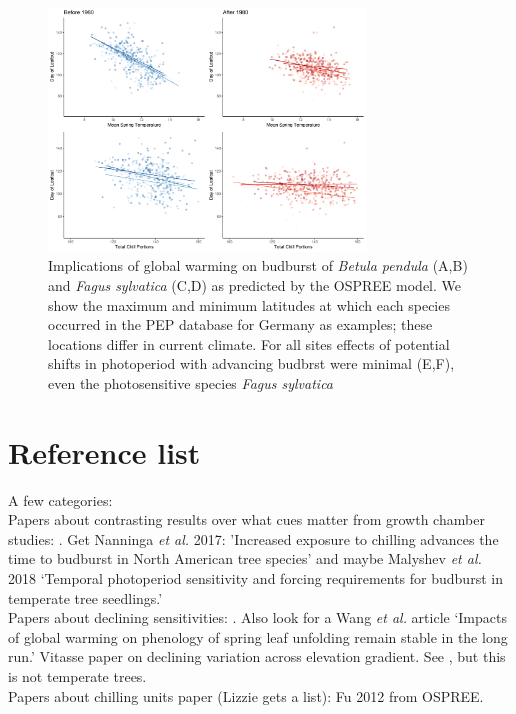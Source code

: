 \documentclass{article}
\begin{document}
\newpage
\begin{figure}[h!]
\centering
\noindent \includegraphics[width=0.75\textwidth]{..//..//analyses/bb_analysis/PEP_climate/figures/BETPEN_multruns_portions.pdf}
\caption{Implications of global warming on budburst of \emph{Betula pendula} (A,B) and \emph{Fagus sylvatica} (C,D) as predicted by the OSPREE model. We show the maximum and minimum latitudes at which each species occurred in the PEP database for Germany as examples; these locations differ in current climate. For all sites effects of potential shifts in photoperiod with advancing budbrst were minimal (E,F), even the photosensitive species \emph{Fagus sylvatica}}
\label{fig:pep}
\end{figure}


\section*{Reference list}

A few categories:\\

Papers about contrasting results over what cues matter from growth chamber studies: \cite{Basler:2012,Basler:2014aa,Caffarra:2011qf,Caffarra:2011a,Caffarra:2011b,Heide:2005aa,koerner2010b,Laube:2014a,vitasse2013,zohner2016}. Get Nanninga \emph{et al.} 2017: 'Increased exposure to chilling advances the time to budburst in North American tree species' and maybe Malyshev \emph{et al.} 2018 `Temporal photoperiod sensitivity and forcing requirements for budburst in temperate tree seedlings.'\\

Papers about declining sensitivities: \cite{Rutishauser:2008,fu2015}. Also look for a Wang \emph{et al.} article `Impacts of global warming on phenology of spring leaf unfolding remain stable in the long run.' Vitasse paper on declining variation across elevation gradient. See \cite{yu2010}, but this is not temperate trees. \\

Papers about chilling units paper (Lizzie gets a list): Fu 2012 from OSPREE. \cite{harrington2015}\cite{lued2011,Luedeling:2011qe,Luedeling2013AgFM}\\



\end{document}
